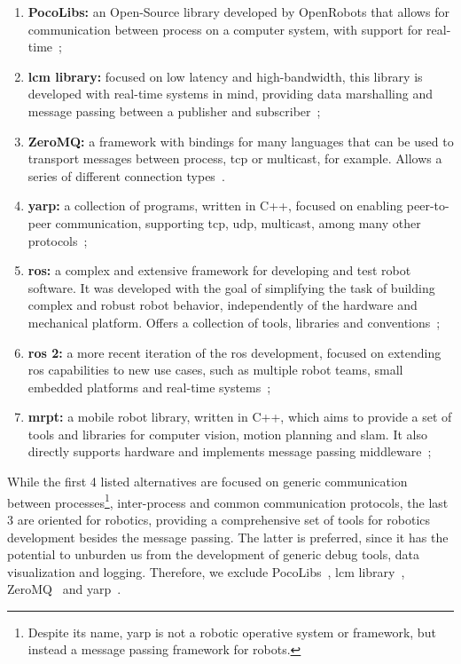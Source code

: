 \begin{enumerate}
	\item \textbf{PocoLibs:} an Open-Source library developed by OpenRobots that allows for communication between process on a computer system, with support for real-time~\cite{Pocolibs};
	\item \textbf{\ac{lcm} library:} focused on low latency and high-bandwidth, this library is developed with real-time systems in mind, providing data marshalling and message passing between a publisher and subscriber~\cite{Huang2010b};
	\item \textbf{ZeroMQ:} a framework with bindings for many languages that can be used to transport messages between process, \ac{tcp} or multicast, for example. Allows a series of different connection types~\cite{ZeroMQ}.
	\item \textbf{\ac{yarp}:} a collection of programs, written in C++, focused on enabling peer-to-peer communication, supporting \ac{tcp}, \ac{udp}, multicast, among many other protocols~\cite{Metta2006};
	\item \textbf{\ac{ros}:} a complex and extensive framework for developing and test robot software. It was developed with the goal of simplifying the task of building complex and robust robot behavior, independently of the hardware and mechanical platform. Offers a collection of tools, libraries and conventions~\cite{ROS};
	\item \textbf{\ac{ros} 2:} a more recent iteration of the \ac{ros} development, focused on extending \ac{ros} capabilities to new use cases, such as multiple robot teams, small embedded platforms and real-time systems~\cite{ROS2};
	\item \textbf{\ac{mrpt}:} a mobile robot library, written in C++, which aims to provide a set of tools and libraries for computer vision, motion planning and \ac{slam}. It also directly supports hardware and implements message passing middleware~\cite{MRPT};
\end{enumerate}

While the first 4 listed alternatives are focused on generic communication between processes\footnote{Despite its name, \acf{yarp} is not a robotic operative system or framework, but instead a message passing framework for robots.}, inter-process and common communication protocols, the last 3 are oriented for robotics, providing a comprehensive set of tools for robotics development besides the message passing. The latter is preferred, since it has the potential to unburden us from the development of generic debug tools, data visualization and logging. Therefore, we exclude PocoLibs~\cite{Pocolibs}, \ac{lcm} library~\cite{Huang2010b}, ZeroMQ~\cite{ZeroMQ} and \ac{yarp}~\cite{Metta2006}.

